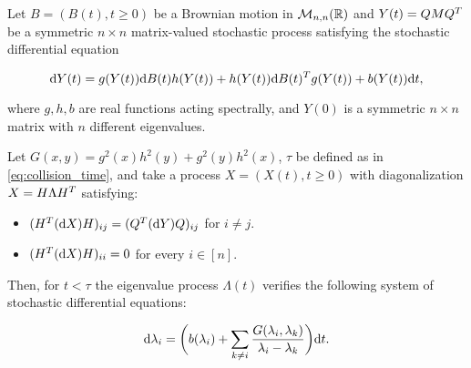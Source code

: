 \begin{theorem} \label{thm:deterministic_diffusion}
    Let $B = (B(t), t\ge 0)$ be a Brownian motion in $\mathcal M_{n,n}(\mathbb R)$ and $Y(t) = QMQ^T$ be a symmetric $n\times n$ matrix-valued stochastic process satisfying the stochastic differential equation

    \begin{equation}
        \mathrm d Y(t) = g(Y(t)) \mathrm d B(t) h(Y(t)) + h(Y(t)) \mathrm d B(t)^T g(Y(t)) + b(Y(t))\mathrm d t, \label{eq:matrix_diffusion}
    \end{equation}

    where $g,h,b$ are real functions acting spectrally, and $Y(0)$ is a symmetric $n\times n$ matrix with $n$ different eigenvalues.

    Let $G(x,y) = g^2(x)h^2(y) + g^2(y)h^2(x)$, $\tau$ be defined as in \eqref{eq:collision_time}, and take a process $X = (X(t), t\ge 0)$ with diagonalization $X = H \Lambda H^T$ satisfying:
    \begin{itemize}
        \item $(H^T (\mathrm d X) H)_{ij} = (Q^T ( \mathrm d Y) Q)_{ij}$ for $i\neq j$.
        \item $(H^T (\mathrm d X) H)_{ii}=0$ for every $i \in [n]$.
    \end{itemize}
    
    Then, for $t < \tau$ the eigenvalue process $\Lambda(t)$ verifies the following system of stochastic differential equations:

    \begin{equation}
        \mathrm d \lambda_i = \biggl( b(\lambda_i) + \sum_{k\neq i} \frac{G(\lambda_i,\lambda_k)}{\lambda_i - \lambda_k} \biggr)\mathrm d t. \label{eq:deterministic_diffusion}
    \end{equation}
\end{theorem}


